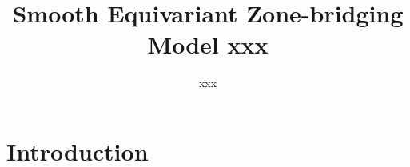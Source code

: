 \documentclass[fleqn,12pt]{wlscirep}
\title{
Smooth Equivariant Zone-bridging Model xxx
}
\author[1,2,3]{xxx}
\affil[1]{xxx}
\begin{document}
\flushbottom
\maketitle
%
%
\thispagestyle{empty}


\section{Introduction}



\end{document}
